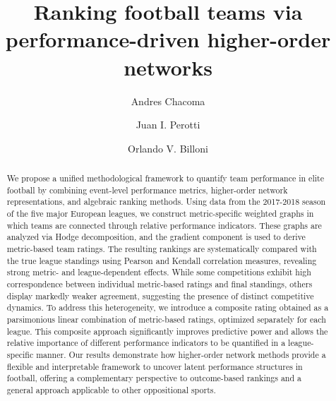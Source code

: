 \documentclass[preprint, amsmath,amssymb, pre]{revtex4-2}
\begin{document}
\title{Ranking football teams via performance-driven higher-order networks}




\author{Andres Chacoma}

\author{Juan I. Perotti}

\author{Orlando V. Billoni}


\begin{abstract}
We propose a unified methodological framework to quantify team performance in elite football by combining event-level performance metrics, higher-order network representations, and algebraic ranking methods. Using data from the 2017-2018 season of the five major European leagues, we construct metric-specific weighted graphs in which teams are connected through relative performance indicators. These graphs are analyzed via Hodge decomposition, and the gradient component is used to derive metric-based team ratings. The resulting rankings are systematically compared with the true league standings using Pearson and Kendall correlation measures, revealing strong metric- and league-dependent effects. While some competitions exhibit high correspondence between individual metric-based ratings and final standings, others display markedly weaker agreement, suggesting the presence of distinct competitive dynamics. To address this heterogeneity, we introduce a composite rating obtained as a parsimonious linear combination of metric-based ratings, optimized separately for each league. This composite approach significantly improves predictive power and allows the relative importance of different performance indicators to be quantified in a league-specific manner. Our results demonstrate how higher-order network methods provide a flexible and interpretable framework to uncover latent performance structures in football, offering a complementary perspective to outcome-based rankings and a general approach applicable to other oppositional sports.
\end{abstract}
\end{document}
